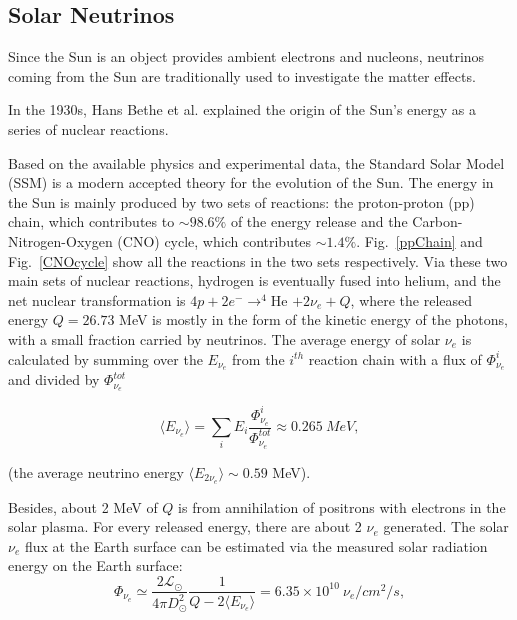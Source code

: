 \subsection{Solar Neutrinos}
Since the Sun is an object provides ambient electrons and nucleons, neutrinos coming from the Sun are traditionally used to investigate the matter effects.

In the 1930s, Hans Bethe et al. explained the origin of the Sun's energy as a series of nuclear reactions\cite{bethe1939energy}.

Based on the available physics and experimental data, the Standard Solar Model (SSM) is a modern accepted theory for the evolution of the Sun. The energy in the Sun is mainly produced by two sets of reactions: the proton-proton (pp) chain, which contributes to $\sim 98.6\%$ of the energy release and the Carbon-Nitrogen-Oxygen (CNO) cycle, which contributes $\sim 1.4\%$. Fig.~\ref{ppChain} and Fig.~\ref{CNOcycle} show all the reactions in the two sets respectively. Via these two main sets of nuclear reactions, hydrogen is eventually fused into helium, and the net nuclear transformation is $4p+2e^-\to^{4}$He $+2\nu_e+Q$, where the released energy $Q=26.73$ MeV is mostly in the form of the kinetic energy of the photons, with a small fraction carried by neutrinos\cite{valle2015neutrinos,antonio2018state}. The average energy of solar $\nu_e$ is calculated by summing over the $E_{\nu_e}$ from the $i^{th}$ reaction chain with a flux of $\Phi_{\nu_e}^i$ and divided by $\Phi^{tot}_{\nu_e}$

%
\begin{equation}
\langle E_{\nu_e}\rangle = \sum_i E_i \frac{\Phi^i_{\nu_e}}{\Phi^{tot}_{\nu_e}}\approx 0.265~MeV,
\end{equation}

(the average neutrino energy $\langle E_{2\nu_e} \rangle\sim 0.59$ MeV). 

Besides, about 2 MeV of $Q$ is from annihilation of positrons with electrons in the solar plasma\cite{valle2015neutrinos,antonio2018state}. For every released energy, there are about 2 $\nu_e$ generated. The solar $\nu_e$ flux at the Earth surface can be estimated via the measured solar radiation energy on the Earth surface:
\begin{equation}
\Phi_{\nu_e} \simeq \frac{2\mathcal{L}_{\odot}}{4\pi D_\odot^2}\frac{1}{Q-2\langle E_{\nu_e} \rangle}= 6.35\times 10^{10}~\nu_e/cm^2/s,
\end{equation}

